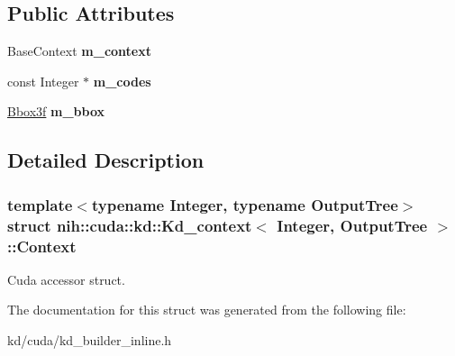 \subsection*{\-Public \-Attributes}
\begin{DoxyCompactItemize}
\item 
\hypertarget{structnih_1_1cuda_1_1kd_1_1_kd__context_1_1_context_ad41a697dec488c57220ba7b5121581c0}{
\-Base\-Context {\bfseries m\-\_\-context}}
\label{structnih_1_1cuda_1_1kd_1_1_kd__context_1_1_context_ad41a697dec488c57220ba7b5121581c0}

\item 
\hypertarget{structnih_1_1cuda_1_1kd_1_1_kd__context_1_1_context_a498160441f99d1ebfcb7259f774c7637}{
const \-Integer $\ast$ {\bfseries m\-\_\-codes}}
\label{structnih_1_1cuda_1_1kd_1_1_kd__context_1_1_context_a498160441f99d1ebfcb7259f774c7637}

\item 
\hypertarget{structnih_1_1cuda_1_1kd_1_1_kd__context_1_1_context_a295bc11728c7e1023b03dac4d4315ad9}{
\hyperlink{structnih_1_1_bbox}{\-Bbox3f} {\bfseries m\-\_\-bbox}}
\label{structnih_1_1cuda_1_1kd_1_1_kd__context_1_1_context_a295bc11728c7e1023b03dac4d4315ad9}

\end{DoxyCompactItemize}


\subsection{\-Detailed \-Description}
\subsubsection*{template$<$typename Integer, typename Output\-Tree$>$struct nih\-::cuda\-::kd\-::\-Kd\-\_\-context$<$ Integer, Output\-Tree $>$\-::\-Context}

\-Cuda accessor struct. 

\-The documentation for this struct was generated from the following file\-:\begin{DoxyCompactItemize}
\item 
kd/cuda/kd\-\_\-builder\-\_\-inline.\-h\end{DoxyCompactItemize}
